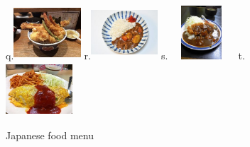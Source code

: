 \documentclass[uplatex,dvipdfmx,b5paper,english,10pt]{jsbook}
\begin{document}
\begin{figure}[htb]
{\begin{flushright}
q.\includegraphics[trim=30 50 40 20, clip, width=25mm, height=20mm]{img/tendon.JPG}
r.\includegraphics[trim=30 0 30 0, clip,   width=25mm, height=20mm]{img/curryrice.jpg}
s.\includegraphics[trim=0 20 0 20, clip,   width=25mm, height=20mm]{img/katsucurryrice.jpg}
t.\includegraphics[trim=0 0 0 0, clip,     width=25mm, height=20mm]{img/omurice3.jpg}
\end{flushright}
 }
\caption{Japanese food menu}
\label{fig:japanesefoodmenu}
\end{figure}
\end{document}
